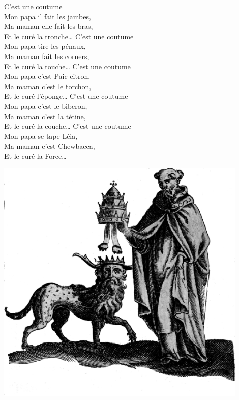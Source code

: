 {C’est une coutume}
\\Mon papa il fait les jambes, \bissimple
\\Ma maman elle fait les bras, \bissimple
\\Et le curé la tronche… \bissimple
{}
{C’est une coutume}
\\Mon papa tire les pénaux, \bissimple
\\Ma maman fait les corners, \bissimple
\\Et le curé la touche… \bissimple
\breakpage
{}
{C’est une coutume}
\\Mon papa c’est Paic citron, \bissimple
\\Ma maman c’est le torchon, \bissimple
\\Et le curé l’éponge… \bissimple
{}
{C’est une coutume}
\\Mon papa c’est le biberon, \bissimple
\\Ma maman c’est la tétine, \bissimple
\\Et le curé la couche… \bissimple
{}
{C’est une coutume}
\\Mon papa se tape Léia, \bissimple
\\Ma maman c’est Chewbacca, \bissimple
\\Et le curé la Force… \bissimple
\bigskip
\begin{center}
\includegraphics[width=0.9\textwidth]{images/brev38.png}
\end{center}

\breakpage
